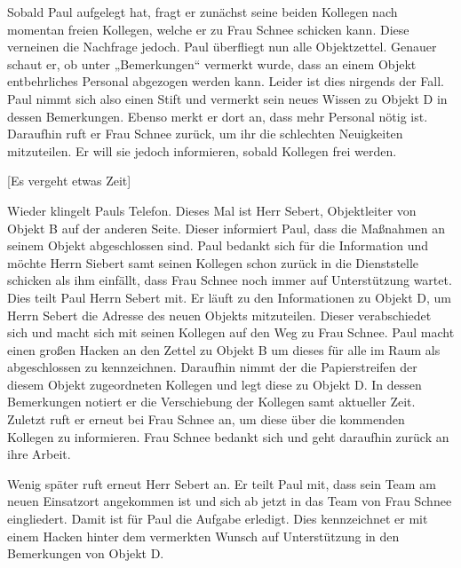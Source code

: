 Sobald Paul aufgelegt hat, fragt er zunächst seine beiden Kollegen nach momentan freien Kollegen, welche er zu Frau Schnee schicken kann. 
Diese verneinen die Nachfrage jedoch. Paul überfliegt nun alle Objektzettel. 
Genauer schaut er, ob unter „Bemerkungen“ vermerkt wurde, dass an einem Objekt entbehrliches Personal abgezogen werden kann. 
Leider ist dies nirgends der Fall. 
Paul nimmt sich also einen Stift und vermerkt sein neues Wissen zu Objekt D in dessen Bemerkungen. 
Ebenso merkt er dort an, dass mehr Personal nötig ist. 
Daraufhin ruft er Frau Schnee zurück, um ihr die schlechten Neuigkeiten mitzuteilen. 
Er will sie jedoch informieren, sobald Kollegen frei werden.

[Es vergeht etwas Zeit]

Wieder klingelt Pauls Telefon. 
Dieses Mal ist Herr Sebert, Objektleiter von Objekt B auf der anderen Seite. 
Dieser informiert Paul, dass die Maßnahmen an seinem Objekt abgeschlossen sind. 
Paul bedankt sich für die Information und möchte Herrn Siebert samt seinen Kollegen schon zurück in die Dienststelle schicken als ihm einfällt, dass Frau Schnee noch immer auf Unterstützung wartet. 
Dies teilt Paul Herrn Sebert mit. 
Er läuft zu den Informationen zu Objekt D, um Herrn Sebert die Adresse des neuen Objekts mitzuteilen. 
Dieser verabschiedet sich und macht sich mit seinen Kollegen auf den Weg zu Frau Schnee.
Paul macht einen großen Hacken an den Zettel zu Objekt B um dieses für alle im Raum als abgeschlossen zu kennzeichnen. 
Daraufhin nimmt der die Papierstreifen der diesem Objekt zugeordneten Kollegen und legt diese zu Objekt D. 
In dessen Bemerkungen notiert er die Verschiebung der Kollegen samt aktueller Zeit. 
Zuletzt ruft er erneut bei Frau Schnee an, um diese über die kommenden Kollegen zu informieren. 
Frau Schnee bedankt sich und geht daraufhin zurück an ihre Arbeit.

Wenig später ruft erneut Herr Sebert an. 
Er teilt Paul mit, dass sein Team am neuen Einsatzort angekommen ist und sich ab jetzt in das Team von Frau Schnee eingliedert. 
Damit ist für Paul die Aufgabe erledigt. 
Dies kennzeichnet er mit einem Hacken hinter dem vermerkten Wunsch auf Unterstützung in den Bemerkungen von Objekt D.
